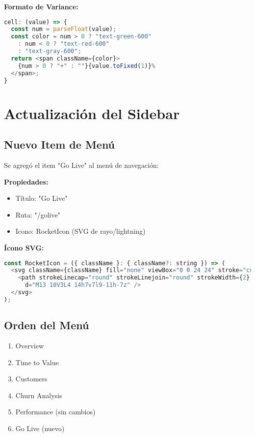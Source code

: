 \documentclass[12pt,a4paper]{article}
\begin{document}
\textbf{Formato de Variance:}
\begin{lstlisting}[language=JavaScript]
cell: (value) => {
  const num = parseFloat(value);
  const color = num > 0 ? "text-green-600"
    : num < 0 ? "text-red-600"
    : "text-gray-600";
  return <span className={color}>
    {num > 0 ? "+" : ""}{value.toFixed(1)}%
  </span>;
}
\end{lstlisting}

\section{Actualización del Sidebar}

\subsection{Nuevo Item de Menú}

Se agregó el item "Go Live" al menú de navegación:

\textbf{Propiedades:}
\begin{itemize}
    \item Título: "Go Live"
    \item Ruta: "/golive"
    \item Icono: RocketIcon (SVG de rayo/lightning)
\end{itemize}

\textbf{Ícono SVG:}
\begin{lstlisting}[language=JavaScript]
const RocketIcon = ({ className }: { className?: string }) => (
  <svg className={className} fill="none" viewBox="0 0 24 24" stroke="currentColor">
    <path strokeLinecap="round" strokeLinejoin="round" strokeWidth={2}
      d="M13 10V3L4 14h7v7l9-11h-7z" />
  </svg>
);
\end{lstlisting}

\subsection{Orden del Menú}
\begin{enumerate}
    \item Overview
    \item Time to Value
    \item Customers
    \item Churn Analysis
    \item Performance (sin cambios)
    \item Go Live (nuevo)
\end{enumerate}
\end{document}
